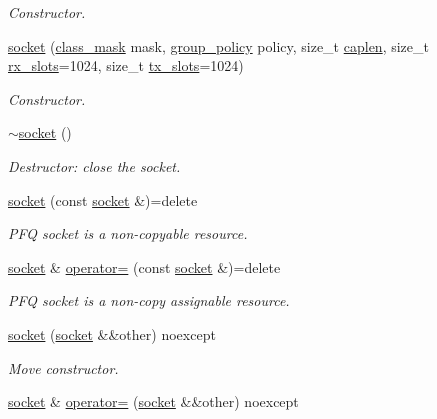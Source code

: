 \begin{DoxyCompactItemize}
\begin{DoxyCompactList}\small\item\em Constructor. \end{DoxyCompactList}\item 
\hyperlink{classpfq_1_1socket_abad0a4046d6af6c5b0b9b9759af6ff0a}{socket} (\hyperlink{namespacepfq_a96af1f5ed530eff563eb917516758fbb}{class\+\_\+mask} mask, \hyperlink{namespacepfq_ac41249c8510558905b01fa4d866a38d7}{group\+\_\+policy} policy, size\+\_\+t \hyperlink{classpfq_1_1socket_ab68dbba5ef01041b9c96758c4a9f0a6c}{caplen}, size\+\_\+t \hyperlink{classpfq_1_1socket_a5cf700fc12d67b91df3d669ac4aa737a}{rx\+\_\+slots}=1024, size\+\_\+t \hyperlink{classpfq_1_1socket_a019d15a072c043d6a1333ca0c836da4c}{tx\+\_\+slots}=1024)
\begin{DoxyCompactList}\small\item\em Constructor. \end{DoxyCompactList}\item 
\hyperlink{classpfq_1_1socket_a08fbdcc1736de36d205282ce20ffbaa3}{$\sim$socket} ()
\begin{DoxyCompactList}\small\item\em Destructor\+: close the socket. \end{DoxyCompactList}\item 
\hyperlink{classpfq_1_1socket_a517b6fdd622cdb2a64f2960176296f8d}{socket} (const \hyperlink{classpfq_1_1socket}{socket} \&)=delete
\begin{DoxyCompactList}\small\item\em P\+F\+Q socket is a non-\/copyable resource. \end{DoxyCompactList}\item 
\hyperlink{classpfq_1_1socket}{socket} \& \hyperlink{classpfq_1_1socket_a3cfd9674358a2ffd8b37e76d73b8a654}{operator=} (const \hyperlink{classpfq_1_1socket}{socket} \&)=delete
\begin{DoxyCompactList}\small\item\em P\+F\+Q socket is a non-\/copy assignable resource. \end{DoxyCompactList}\item 
\hyperlink{classpfq_1_1socket_a1a60820551f1601beb54649d9ae48fa2}{socket} (\hyperlink{classpfq_1_1socket}{socket} \&\&other) noexcept
\begin{DoxyCompactList}\small\item\em Move constructor. \end{DoxyCompactList}\item 
\hyperlink{classpfq_1_1socket}{socket} \& \hyperlink{classpfq_1_1socket_a8022eafa68b84a840292ebcfc4d1ba7a}{operator=} (\hyperlink{classpfq_1_1socket}{socket} \&\&other) noexcept

\end{DoxyCompactItemize}
